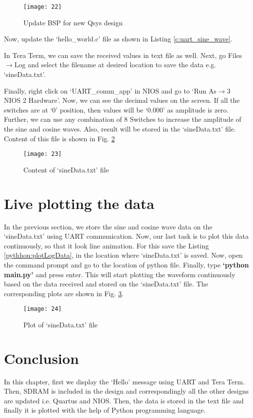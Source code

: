 \begin{figure}[!h]
	\centering
	\texttt{[image: 22]}
	\caption{Update BSP for new Qsys design}
	\label{fig:updateBSPDRAM}
\end{figure}

Now, update the `hello\_world.c' file as shown in Listing \ref{c:uart_sine_wave}. 



In Tera Term, we can save the received values in text file as well. Next, go Files$\rightarrow$Log and select the filename at desired location to save the data e.g. `sineData.txt'. 

Finally, right click on `UART\_comm\_app' in NIOS and go to `Run As$\rightarrow$3 NIOS 2 Hardware'. Now, we can see the decimal values on the screen. If all the switches are at `0' position, then values will be `0.000' as amplitude is zero. Further, we can use any combination of 8 Switches to increase the amplitude of the sine and cosine waves. Also, result will be stored in the  `sineData.txt' file. Content of this file is shown in Fig. \ref{fig:contentLogFile}


\begin{figure}[!h]
	\centering
	\texttt{[image: 23]}
	\caption{Content of `sineData.txt' file}
	\label{fig:contentLogFile}
\end{figure}

\section{Live plotting the data}
In the previous section, we store the sine and cosine wave data on the `sineData.txt' using UART communication. Now, our last task is to plot this data continuously, so that it look line animation. For this save the Listing \ref{pythhon:plotLogData}, in the location where `sineData.txt' is saved. Now, open the command prompt and go to the location of python file. Finally, type \textbf{`python main.py'} and press enter. This will start plotting the waveform continuously based on the data received and stored on the `sineData.txt' file. The corresponding plots are shown in Fig. \ref{fig:plotLogFile}.



\begin{figure}[!h]
	\centering
	\texttt{[image: 24]}
	\caption{Plot of `sineData.txt' file}
	\label{fig:plotLogFile}
\end{figure}


\section{Conclusion}
In this chapter, first we display the `Hello' message using UART and Tera Term. Then, SDRAM is included in the design and correspondingly all the other designs are updated i.e. Quartus and NIOS. Then, the data is stored in the text file and finally it is plotted with the help of Python programming language. 
